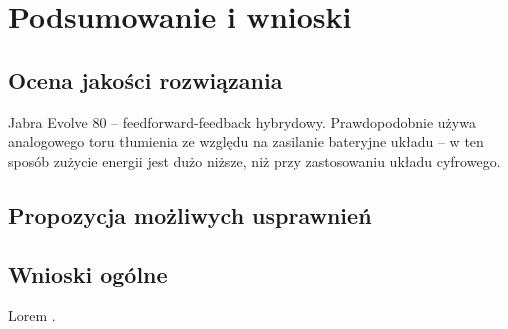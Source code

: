\chapter{Podsumowanie i wnioski}
\label{cha:wnioski}

\section{Ocena jakości rozwiązania}

Jabra Evolve 80 -- feedforward-feedback hybrydowy.\cite{JabraEvolve80} Prawdopodobnie używa analogowego toru tłumienia ze względu na zasilanie bateryjne układu -- w ten sposób zużycie energii jest dużo niższe, niż przy zastosowaniu układu cyfrowego.
\section{Propozycja możliwych usprawnień}

\section{Wnioski ogólne}

Lorem \cite{HayAFT}	\cite{HayLMSAF}.